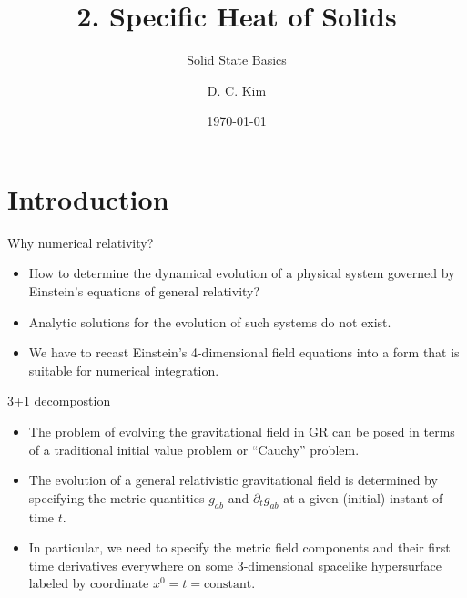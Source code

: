 \documentclass[10pt]{sintefbeamer}
\title{2. Specific Heat of Solids}
\subtitle{Solid State Basics}
\author{D. C. Kim}
\date{\today}
\begin{document}
\maketitle








\section{Introduction}

\begin{frame}{Why numerical relativity?}
	\begin{itemize}
		\item How to determine the dynamical evolution of a physical system governed by Einstein's equations of general relativity?
		\item Analytic solutions for the evolution of such systems do not exist.
		\item We have to recast Einstein's 4-dimensional field equations into a form that is suitable for numerical integration.
	\end{itemize}
\end{frame}

\begin{frame}{3+1 decompostion}
	\begin{itemize}
		\item The problem of evolving the gravitational field in GR can be posed in terms of a traditional initial value problem or ``Cauchy'' problem.
		\item The evolution of a general relativistic gravitational field is determined by specifying the metric quantities $g_{ab}$ and $\partial_t g_{ab}$ at a given (initial) instant of time $t$.
		\item In particular, we need to specify the metric field components and their first time derivatives everywhere on some 3-dimensional spacelike hypersurface labeled by coordinate $x^0 = t = \mathrm{constant}.$
	\end{itemize}
\end{frame}
\end{document}
